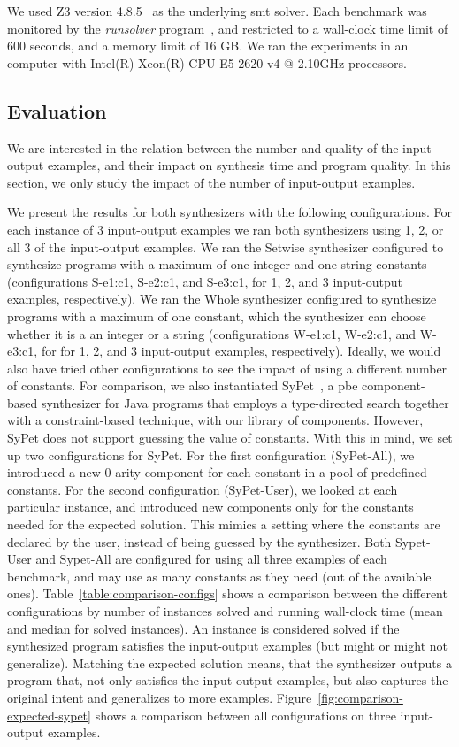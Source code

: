 We used Z3 version 4.8.5~\cite{DeMoura:2008:ZES} as the underlying \gls{smt}
solver. 
Each benchmark was monitored by the \textit{runsolver}
program~\cite{Roussel:2011:JSAT}, and restricted to a wall-clock time limit of
600 seconds, and a memory limit of 16 GB.
We ran the experiments in an computer with Intel(R) Xeon(R) CPU E5-2620 v4 @
2.10GHz processors.

\subsection{Evaluation}
\label{sec:eval}

We are interested in the relation between the number and quality of the
input-output examples, and their impact on synthesis time and program quality.
In this section, we only study the impact of the number of input-output
examples.

We present the results for both synthesizers with the following configurations.
For each instance of 3 input-output examples we ran both synthesizers using 1,
2, or all 3 of the input-output examples.
We ran the Setwise synthesizer configured
to synthesize programs with a maximum of one integer and one string constants
(configurations S-e1:c1, S-e2:c1, and S-e3:c1, for 1, 2, and 3 input-output
examples, respectively).
We ran the Whole synthesizer configured to
synthesize programs with a maximum of one constant, which the synthesizer can
choose whether it is a an integer or a string (configurations W-e1:c1, W-e2:c1,
and W-e3:c1, for for 1, 2, and 3 input-output examples, respectively).
Ideally, we would also have tried other configurations to see the impact of
using a different number of constants.
For comparison, we also instantiated SyPet~\cite{Feng:2017:CSC}, a
\gls{pbe} component-based synthesizer for Java programs that employs a
type-directed search together with a constraint-based technique, with our
library of components.
However, SyPet does not support guessing the value of constants.
With this in mind, we set up two configurations for SyPet.
For the first configuration (SyPet-All), we introduced a new 0-arity component
for each constant in a pool of predefined constants.
For the second configuration (SyPet-User), we looked at each particular
instance, and introduced new components only for the constants needed for the
expected solution.
This mimics a setting where the constants are declared by the user, instead of
being guessed by the synthesizer.
Both Sypet-User and Sypet-All are configured for using all three examples of
each benchmark, and may use as many constants as they need (out of the available
ones).
Table~\ref{table:comparison-configs} shows a comparison between the different
configurations by number of instances solved and running wall-clock time (mean
and median for solved instances).
An instance is considered solved if the synthesized program satisfies the
input-output examples (but might or might not generalize).
Matching the expected solution means, that the synthesizer outputs a program
that, not only satisfies the input-output examples, but also captures the
original intent and generalizes to more examples.
Figure~\ref{fig:comparison-expected-sypet} shows a comparison between all
configurations on three input-output examples.

